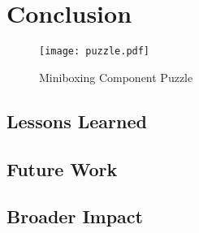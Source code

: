 \chapter{Conclusion}
\label{chapter:concl}

\begin{figure}[h!]
  \centering
  \texttt{[image: puzzle.pdf]}
  \caption{Miniboxing Component Puzzle}
\end{figure}

\section{Lessons Learned}

\section{Future Work}

\section{Broader Impact}
